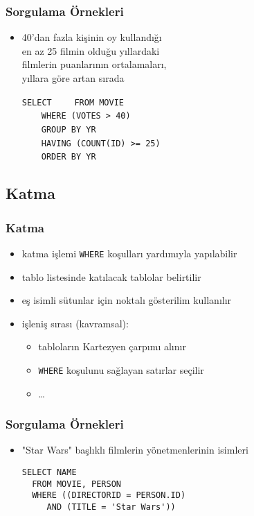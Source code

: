 \documentclass[dvipsnames]{beamer}
\theoremstyle{plain}
\begin{document}
\begin{frame}[fragile]
  \frametitle{Sorgulama Örnekleri}

  \begin{itemize}
    \item 40'dan fazla kişinin oy kullandığı\\
                en az 25 filmin olduğu yıllardaki\\
                filmlerin puanlarının ortalamaları,\\
                yıllara göre artan sırada

\medskip
\lstinline!SELECT! 
~~~~\lstinline!FROM MOVIE!\\
\pause
~~~~\lstinline!WHERE (VOTES > 40)!\\
\pause
~~~~\lstinline!GROUP BY YR!\\
\pause
~~~~\lstinline!HAVING (COUNT(ID) >= 25)!\\
\pause\pause
~~~~\lstinline!ORDER BY YR!
  \end{itemize}
\end{frame}

\subsection{Katma}

\begin{frame}
  \frametitle{Katma}

  \begin{itemize}
    \item katma işlemi \lstinline!WHERE! koşulları yardımıyla yapılabilir
    \item tablo listesinde katılacak tablolar belirtilir
    \item eş isimli sütunlar için noktalı gösterilim kullanılır

    \pause
    \medskip
    \item işleniş sırası (kavramsal):
    \begin{itemize}
      \item tabloların Kartezyen çarpımı alınır
      \item \lstinline!WHERE! koşulunu sağlayan satırlar seçilir
      \item \ldots
    \end{itemize}
  \end{itemize}
\end{frame}

\begin{frame}[fragile]
  \frametitle{Sorgulama Örnekleri}

  \begin{itemize}
    \item "Star Wars" başlıklı filmlerin yönetmenlerinin isimleri
    \begin{lstlisting}
SELECT NAME
  FROM MOVIE, PERSON
  WHERE ((DIRECTORID = PERSON.ID)
     AND (TITLE = 'Star Wars'))
    \end{lstlisting}
  \end{itemize}
\end{frame}
\end{document}
